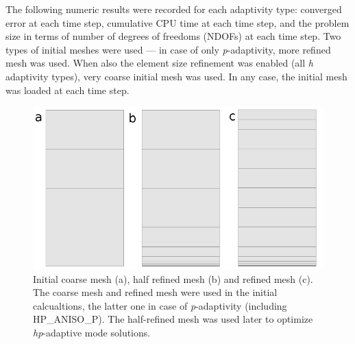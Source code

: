 The following numeric results were recorded for each 
adaptivity type: converged error at each time step, cumulative CPU
time at each time step, and the problem size in terms of number
of degrees of freedoms (NDOFs) at each time step.  
Two types of initial meshes were used --- in case of only \emph{p}-adaptivity,
more refined mesh was used. When also the element size refinement
was enabled (all \emph{h} adaptivity types), very coarse initial mesh
was used. In any case, the initial mesh was loaded at each time step.


\begin{figure}
  \begin{centering}
  \includegraphics[width=.8\columnwidth]{mesh}
  \caption{\label{fig:mesh} Initial coarse mesh (a),
  	half refined mesh (b) and refined mesh (c). The coarse mesh
	and refined mesh were used in the initial calcualtions, the latter one
	in case of \emph{p}-adaptivity (including HP\_ANISO\_P). The half-refined mesh was
	used later to optimize \emph{hp}-adaptive mode solutions.}
  \end{centering}
\end{figure}

